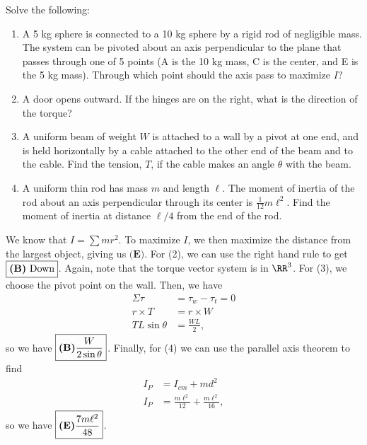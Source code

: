 \documentclass[11pt]{article}
\begin{document}
\begin{example}
	Solve the following:
	\begin{enumerate}
		\item A 5 kg sphere is connected to a 10 kg sphere by a rigid rod of negligible mass. The system can be pivoted about an axis perpendicular to the plane that passes through one of 5 points (A is the 10 kg mass, C is the center, and E is the 5 kg mass). Through which point should the axis pass to maximize $I$?
		\item A door opens outward. If the hinges are on the right, what is the direction of the torque?
		\item A uniform beam of weight $W$ is attached to a wall by a pivot at one end, and is held horizontally by a cable attached to the other end of the beam and to the cable. Find the tension, $T$, if the cable makes an angle $\theta$ with the beam.
		\item A uniform thin rod has mass $m$ and length $\ell$. The moment of inertia of the rod about an axis perpendicular through its center is $\frac{1}{12}m\ell^2$. Find the moment of inertia at distance $\ell/4$ from the end of the rod.
	\end{enumerate}
\end{example}
\begin{solution}
	We know that $I = \sum mr^2$. To maximize $I$, we then maximize the distance from the largest object, giving us $\boxed{\textbf{(E)}}$. For (2), we can use the right hand rule to get $\boxed{\text{\textbf{(B)} Down}}$. Again, note that the torque vector system is in $\RR^3$. For (3), we choose the pivot point on the wall. Then, we have
	\begin{align*}
		\Sigma \tau &= \tau_w - \tau_t = 0 \\
		r\times T &= r\times W \\
		TL\sin\theta &= \frac{WL}{2},
	\end{align*}
	so we have $\boxed{\text{\textbf{(B)}} \frac{W}{2\sin\theta}}$. Finally, for (4) we can use the parallel axis theorem to find
	\begin{align*}
		I_P &= I_{cm} + md^2 \\
		I_P &= \frac{m\ell^2}{12} + \frac{m\ell^2}{16},
	\end{align*}
	so we have $\boxed{\text{\textbf{(E)}} \frac{7m\ell^2}{48}}$.
\end{solution}
\end{document}
